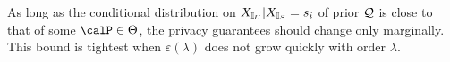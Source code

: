 As long as the conditional distribution on ${X_{\mathbb{I}_U}}|{X_{\mathbb{I}_S}} = s_i$ of prior $\mathcal{Q}$ is close to that of some $\calP \in \Theta$, the privacy guarantees should change only marginally. This bound is tightest when $\varepsilon(\lambda)$ does not grow quickly with order $\lambda$.



%
%		
%				
%	
%

